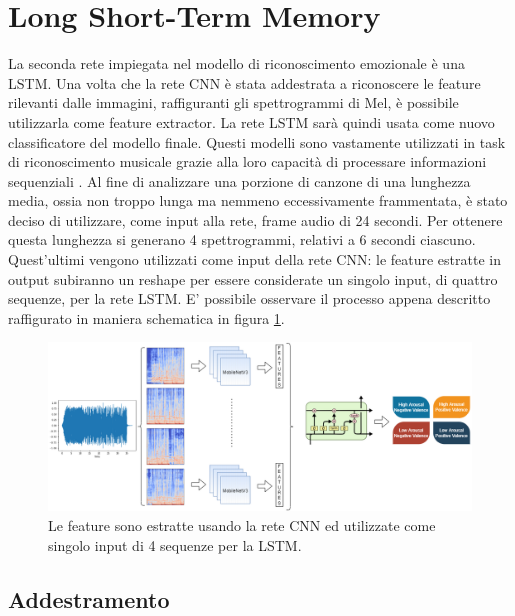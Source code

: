 \documentclass[11pt]{report}
\begin{document}
\newpage

\section{Long Short-Term Memory}


La seconda rete impiegata nel modello di riconoscimento emozionale è una LSTM. Una volta che la rete CNN è stata addestrata a riconoscere le feature rilevanti dalle immagini, raffiguranti gli spettrogrammi di Mel, è possibile utilizzarla come feature extractor. La rete LSTM sarà quindi usata come nuovo classificatore del modello finale. Questi modelli sono vastamente utilizzati in task di riconoscimento musicale grazie alla loro capacità di processare informazioni sequenziali \cite{hochreiter1997long}. Al fine di analizzare una porzione di canzone di una lunghezza media, ossia non troppo lunga ma nemmeno eccessivamente frammentata, è stato deciso di utilizzare, come input alla rete, frame audio di 24 secondi. Per ottenere questa lunghezza si generano 4 spettrogrammi, relativi a 6 secondi ciascuno. Quest'ultimi vengono utilizzati come input della rete CNN: le feature estratte in output subiranno un reshape per essere considerate un singolo input, di quattro sequenze, per la rete LSTM. E' possibile osservare il processo appena descritto raffigurato in maniera schematica in figura \ref{fig:lstm-feature}.

\vspace{2cm}

\begin{figure}[h]
\centering
\includegraphics[scale = 0.52]{img/LSTM-Training.png}
\caption{Le feature sono estratte usando la rete CNN ed utilizzate come singolo input di 4 sequenze per la LSTM.}
\label{fig:lstm-feature}
\end{figure}

\newpage


\subsection{Addestramento}
\end{document}
